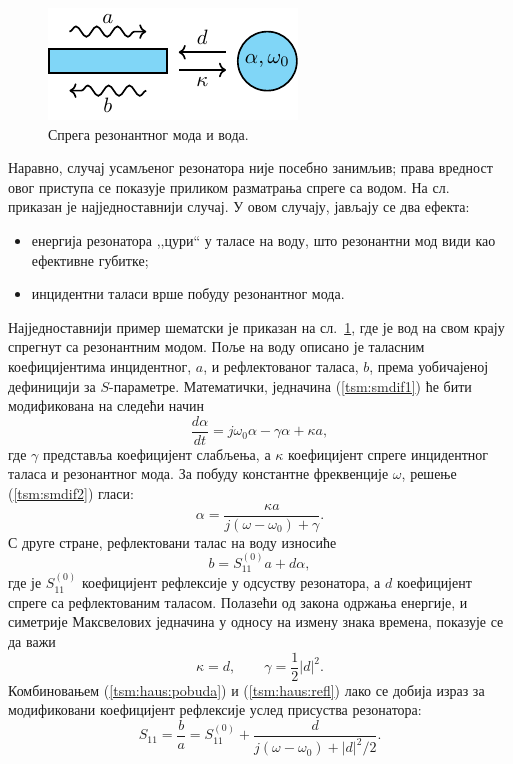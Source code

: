 \begin{figure}[h] 
\centering
\includegraphics[width=0.4\linewidth]{sl_tsm/sm-vod1.pdf}
\caption{Спрега резонантног мода и вода.}
\label{tsm:fig:slike/smfig}
\end{figure}
Наравно, случај усамљеног резонатора није посебно занимљив; права вредност овог приступа се показује приликом разматрања спреге са водом. На сл.~ приказан је најједноставнији случај. У овом случају, јављају се два ефекта:
\begin{itemize}
\item енергија резонатора ,,цури`` у таласе на воду, што резонантни мод види као ефективне губитке;
\item инцидентни таласи врше побуду резонантног мода.
\end{itemize}
Најједноставнији пример шематски је приказан на сл.~\ref{tsm:fig:slike/smfig}, где је вод на свом крају спрегнут са резонантним модом. Поље на воду описано је таласним коефицијентима инцидентног, $a$, и рефлектованог таласа, $b$, према уобичајеној дефиницији за $S$-параметре. Математички, једначина (\ref{tsm:smdif1}) ће бити модификована на следећи начин
\begin{equation}
\frac{d\alpha}{dt} = j\omega_0 \alpha - \gamma \alpha + \kappa a,
\label{tsm:smdif2}
\end{equation}
где $\gamma$ представља коефицијент слабљења, а $\kappa$ коефицијент спреге инцидентног таласа и резонантног мода. За побуду константне фреквенције $\omega$, решење (\ref{tsm:smdif2}) гласи:
\begin{equation}
\alpha = \frac{\kappa a}{j(\omega-\omega_0) + \gamma}.
\label{tsm:haus:pobuda}
\end{equation}
С друге стране, рефлектовани талас на воду износиће
\begin{equation}
b = S_{11}^{(0)} a + d\alpha,
\label{tsm:haus:refl}
\end{equation}
где је $S_{11}^{(0)}$ коефицијент рефлексије у одсуству резонатора, а $d$ коефицијент спреге са рефлектованим таласом. Полазећи од закона одржања енергије, и симетрије Максвелових једначина у односу на измену знака времена, показује се да важи
\begin{equation}
\kappa = d,\qquad \gamma = \frac{1}{2}|d|^2.
\end{equation}
Комбиновањем (\ref{tsm:haus:pobuda}) и (\ref{tsm:haus:refl}) лако се добија израз за модификовани коефицијент рефлексије услед присуства резонатора:
\begin{equation}
S_{11} = \frac{b}{a} = S_{11}^{(0)} + \frac{d}{j(\omega-\omega_0) + {|d|^2}/{2}}.
\end{equation}

